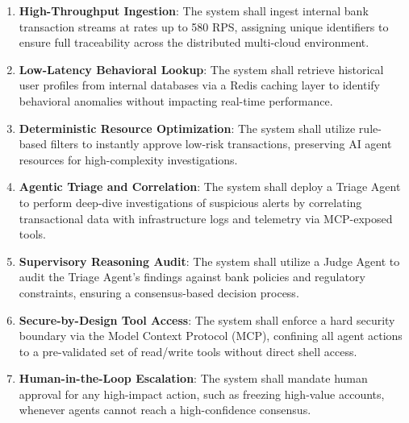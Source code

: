 \documentclass[12pt]{report}
\begin{document}
\begin{enumerate}

\item \textbf{High-Throughput Ingestion}: The system shall ingest internal bank transaction streams at rates up to 580 RPS, assigning unique identifiers to ensure full traceability across the distributed multi-cloud environment.

\item \textbf{Low-Latency Behavioral Lookup}: The system shall retrieve historical user profiles from internal databases via a Redis caching layer to identify behavioral anomalies without impacting real-time performance.

\item \textbf{Deterministic Resource Optimization}: The system shall utilize rule-based filters to instantly approve low-risk transactions, preserving AI agent resources for high-complexity investigations.

\item \textbf{Agentic Triage and Correlation}: The system shall deploy a Triage Agent to perform deep-dive investigations of suspicious alerts by correlating transactional data with infrastructure logs and telemetry via MCP-exposed tools.

\item \textbf{Supervisory Reasoning Audit}: The system shall utilize a Judge Agent to audit the Triage Agent's findings against bank policies and regulatory constraints, ensuring a consensus-based decision process.

\item \textbf{Secure-by-Design Tool Access}: The system shall enforce a hard security boundary via the Model Context Protocol (MCP), confining all agent actions to a pre-validated set of read/write tools without direct shell access.

\item \textbf{Human-in-the-Loop Escalation}: The system shall mandate human approval for any high-impact action, such as freezing high-value accounts, whenever agents cannot reach a high-confidence consensus.

\end{enumerate}
\end{document}
